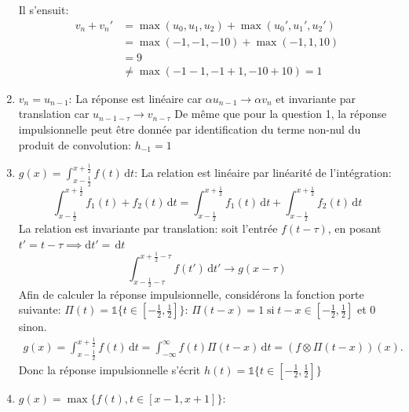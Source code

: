 \documentclass[12pt]{article}
\begin{document}
\begin{enumerate}
\begin{itemize}
\end{itemize}
Il s'ensuit: 
\begin{equation*}
\begin{split}
 v_n + v_n' &= \max(u_0, u_1, u_2) + \max(u_0', u_1', u_2') \\
			&= \max(-1, -1, -10) + \max(-1, 1, 10) \\
			&= 9 \\
			&\neq \max(-1-1, -1+1, -10 + 10) = 1
\end{split}
\end{equation*}
\item $v_n = u_{n-1}$: \newline
La réponse est linéaire car $\alpha u_{n-1} \rightarrow \alpha v_n$ et invariante par translation \newline car $u_{n-1-\tau} \rightarrow v_{n-\tau}$ \newline
De même que pour la question 1, la réponse impulsionnelle peut être donnée par identification du terme non-nul du produit de convolution: $h_{-1} = 1$
\item $g(x) = \int_{x-\frac{1}{2}}^{x+\frac{1}{2}} f(t) \,\mathrm{d}t$: \newline
La relation est linéaire par linéarité de l'intégration: $$\int_{x-\frac{1}{2}}^{x+\frac{1}{2}} f_1(t) + f_2(t) \,\mathrm{d}t = \int_{x-\frac{1}{2}}^{x+\frac{1}{2}} f_1(t) \,\mathrm{d}t+ \int_{x-\frac{1}{2}}^{x+\frac{1}{2}} f_2(t) \,\mathrm{d}t$$ \newline
La relation est invariante par translation: soit l'entrée $f(t-\tau)$, \newline en posant $t' = t -\tau \implies \mathrm{d}t' = \,\mathrm{d}t $ $$\int_{x-\frac{1}{2}-\tau}^{x+\frac{1}{2}-\tau} f(t')\,\mathrm{d}t' \rightarrow g(x-\tau)$$
Afin de calculer la réponse impulsionnelle, considérons la fonction porte suivante: $\Pi(t) = \mathds{1}\{t \in {[{-\frac{1}{2}}, \frac{1}{2}]}\}$:  $\Pi(t-x) = 1 \;\text{si}\; t-x \in {[{-\frac{1}{2}}, \frac{1}{2}]}$ et 0 sinon.\newline
\begin{equation*}\begin{split}
g(x) = \int_{x-\frac{1}{2}}^{x+\frac{1}{2}} f(t) \,\mathrm{d}t = \int_{-\infty}^{\infty} f(t) \Pi(t-x) \,\mathrm{d}t = (f \otimes \Pi(t-x))(x).
\end{split}\end{equation*}
Donc la réponse impulsionnelle s'écrit $h(t) = \mathds{1}\{t\in {[{-\frac{1}{2}}, \frac{1}{2}]}\}$
\item $g(x) = \max\{f(t), t \in {[x-1, x+1]}\}$: \newline

\end{enumerate}
\end{document}

